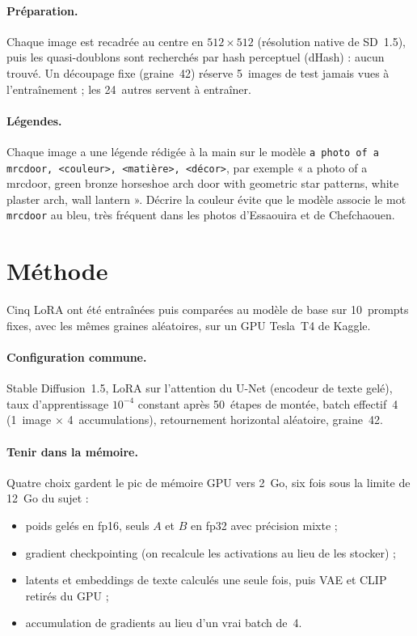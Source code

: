 \documentclass[11pt,a4paper]{article}
\newcommand{\code}[1]{\texttt{\small #1}}
\newcommand{\trig}{\code{mrcdoor}}
\begin{document}
\paragraph{Préparation.} Chaque image est recadrée au centre en $512\times512$ (résolution native de SD~1.5), puis les quasi-doublons sont recherchés par hash perceptuel (dHash) : aucun trouvé. Un découpage fixe (graine~42) réserve 5~images de test jamais vues à l'entraînement ; les 24~autres servent à entraîner.

\paragraph{Légendes.} Chaque image a une légende rédigée à la main sur le modèle \code{a photo of a mrcdoor, <couleur>, <matière>, <décor>}, par exemple « a photo of a mrcdoor, green bronze horseshoe arch door with geometric star patterns, white plaster arch, wall lantern ». Décrire la couleur évite que le modèle associe le mot \trig{} au bleu, très fréquent dans les photos d'Essaouira et de Chefchaouen.

\section{Méthode}

Cinq LoRA ont été entraînées puis comparées au modèle de base sur 10~prompts fixes, avec les mêmes graines aléatoires, sur un GPU Tesla~T4 de Kaggle.

\paragraph{Configuration commune.} Stable Diffusion~1.5, LoRA sur l'attention du U-Net (encodeur de texte gelé), taux d'apprentissage $10^{-4}$ constant après 50~étapes de montée, batch effectif~4 (1~image $\times$ 4~accumulations), retournement horizontal aléatoire, graine~42.

\paragraph{Tenir dans la mémoire.} Quatre choix gardent le pic de mémoire GPU vers 2~Go, six fois sous la limite de 12~Go du sujet :
\begin{itemize}
  \item poids gelés en fp16, seuls $A$ et $B$ en fp32 avec précision mixte ;
  \item gradient checkpointing (on recalcule les activations au lieu de les stocker) ;
  \item latents et embeddings de texte calculés une seule fois, puis VAE et CLIP retirés du GPU ;
  \item accumulation de gradients au lieu d'un vrai batch de~4.
\end{itemize}
\end{document}
